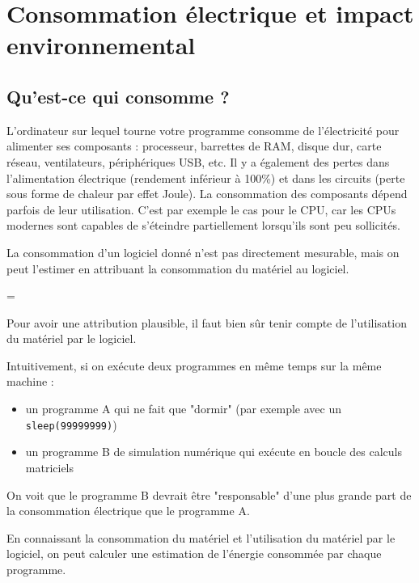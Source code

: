 \documentclass[a4paper,10pt]{article}
\newenvironment{information}
  {\par\begin{mdframed}[linewidth=2pt,linecolor=blue]%
    \begin{list}{}{\leftmargin=1cm
                   \labelwidth=\leftmargin}\item[\emoji{information}]}
  {\end{list}\end{mdframed}\par}
\begin{document}







\section{Consommation électrique et impact environnemental}

\subsection{Qu'est-ce qui consomme ?}

L'ordinateur sur lequel tourne votre programme consomme de l'électricité pour
alimenter ses composants : processeur, barrettes de RAM, disque dur, carte
réseau, ventilateurs, périphériques USB, etc. Il y a également des pertes dans
l'alimentation électrique (rendement inférieur à 100\%) et dans les circuits
(perte sous forme de chaleur par effet Joule). La consommation des composants
dépend parfois de leur utilisation. C'est par exemple le cas pour le CPU, car
les CPUs modernes sont capables de s'éteindre partiellement lorsqu'ils sont peu
sollicités.

La consommation d'un logiciel donné n'est pas directement mesurable, mais on
peut l'estimer en attribuant la consommation du matériel au logiciel.
 
\begin{information}
    Pour avoir une attribution plausible, il faut bien sûr tenir compte de
    l'utilisation du matériel par le logiciel.

    Intuitivement, si on exécute deux programmes en même temps sur la même machine :
    \begin{itemize}
        \item un programme A qui ne fait que "dormir" (par exemple avec un \texttt{sleep(99999999)})
        \item un programme B de simulation numérique qui exécute en boucle des calculs matriciels
    \end{itemize}  
  
    On voit que le programme B devrait être "responsable" d'une plus grande part
    de la consommation électrique que le programme A.
  
    En connaissant la consommation du matériel et l'utilisation du matériel par
    le logiciel, on peut calculer une estimation de l'énergie consommée par
    chaque programme.
  
\end{information}
  
\end{document}
